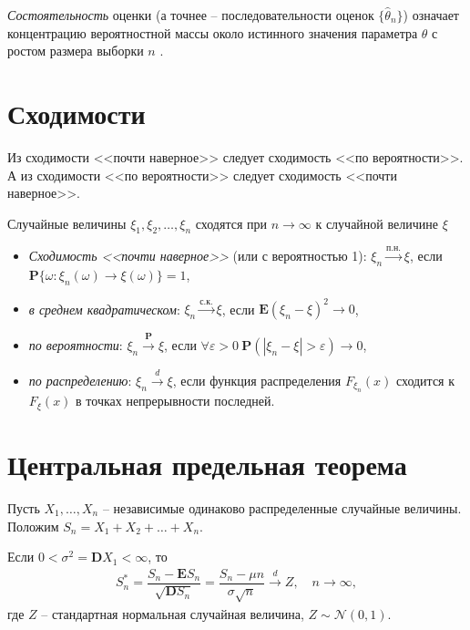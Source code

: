 \documentclass[%
	11pt,
	a4paper,
	utf8,
		]{article}
\begin{document}
\emph{Состоятельность} оценки (а точнее -- последовательности оценок $ \{\hat{\theta}_n\} $) означает концентрацию вероятностной массы около истинного значения параметра $ \theta $ с ростом размера выборки $ n $ \cite[75]{lagutin:2009}.

\section{Сходимости}

Из сходимости <<почти наверное>> следует сходимость <<по вероятности>>. А из сходимости <<по вероятности>> следует сходимость <<почти наверное>>.

Случайные величины $ \xi_1, \xi_2, \ldots, \xi_n $ сходятся при $ n \to \infty $ к случайной величине $ \xi $
\begin{itemize}
	\item \emph{Сходимость <<почти наверное>>} (или с вероятностью 1): $ \xi_n \xrightarrow{\text{п.н.}} \xi $, если $ \mathbf{P}\{ \omega: \xi_n(\omega) \to \xi(\omega) \} = 1 $,
	
	\item \emph{в среднем квадратическом}: $ \xi_n \xrightarrow{\text{с.к.}} \xi $, если $ \mathbf{E}(\xi_n - \xi)^2 \to 0 $,
	
	\item \emph{по вероятности}: $ \xi_n \xrightarrow{\mathbf{P}} \xi $, если $ \forall \varepsilon > 0 \ \mathbf{P}(| \xi_n - \xi | > \varepsilon) \to 0 $, 
	
	\item \emph{по распределению}: $ \xi_n \xrightarrow{d} \xi $, если функция распределения $ F_{\xi_n}(x) $ сходится к $ F_{\xi}(x) $ в точках непрерывности последней.
\end{itemize}



\section{Центральная предельная теорема}

Пусть $ X_1,\dots, X_n $ -- независимые одинаково распределенные случайные величины. Положим $ S_n = X_1 + X_2 + \dots + X_n $.

Если $ 0 < \sigma^2 = \mathbf{D}X_1 < \infty $, то
\begin{align*}
	S^{*}_n = \dfrac{ S_n - \mathbf{E}S_n }{ \sqrt{\mathbf{D} S_n} } = \dfrac{S_n - \mu n}{\sigma \sqrt{n}} \xrightarrow{d} Z, \quad n \to \infty,
\end{align*}
где $ Z $ -- стандартная нормальная случайная величина, $ Z \sim \mathcal{N}(0, 1) $.
\end{document}
